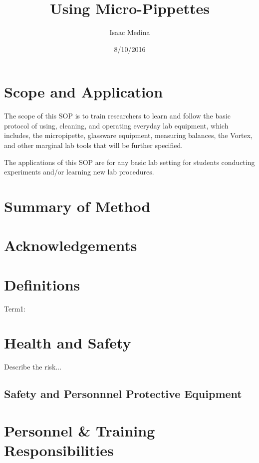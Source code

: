 \documentclass[12pt]{../SOP3_beta}\usepackage[]{graphicx}\usepackage[]{color}
\title{Using Micro-Pippettes}
\date{8/10/2016}
\author{Isaac Medina}
\begin{document}
\maketitle 


\section{Scope and Application}

\NP The scope of this SOP is  to train researchers to learn and follow the basic protocol of using, cleaning, and operating everyday lab equipment, which includes, the micropipette, glassware equipment, measuring balances, the Vortex, and other marginal lab tools that will be further specified. 

\NP The applications of this SOP are for any basic lab setting for students conducting experiments and/or learning new lab procedures.

\section{Summary of Method}

\NP 

\tableofcontents

\newpage

\section{Acknowledgements}

\section{Definitions}

\NP Term1:


\section{Health and Safety}

\NP Describe the risk...


\subsection*{Safety and Personnnel Protective Equipment}


\section{Personnel \& Training Responsibilities}
\end{document}
